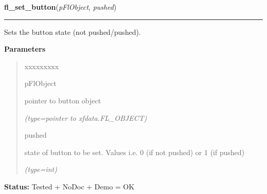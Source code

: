 \hspace{.8\funcindent}\begin{boxedminipage}{\funcwidth}

    \raggedright \textbf{fl\_set\_button}(\textit{pFlObject}, \textit{pushed})

    \vspace{-1.5ex}

    \rule{\textwidth}{0.5\fboxrule}
\setlength{\parskip}{2ex}
    Sets the button state (not pushed/pushed).

\setlength{\parskip}{1ex}
      \textbf{Parameters}
      \vspace{-1ex}

      \begin{quote}
        \begin{Ventry}{xxxxxxxxx}

          \item[pFlObject]

          pointer to button object

            {\it (type=pointer to xfdata.FL\_OBJECT)}

          \item[pushed]

          state of button to be set. Values i.e. 0 (if not pushed) or 1 (if
          pushed)

            {\it (type=int)}

        \end{Ventry}

      \end{quote}

\textbf{Status:} Tested + NoDoc + Demo = OK



    \end{boxedminipage}

    \label{xformslib:flbutton:fl_get_button_numb}

    \vspace{0.5ex}

